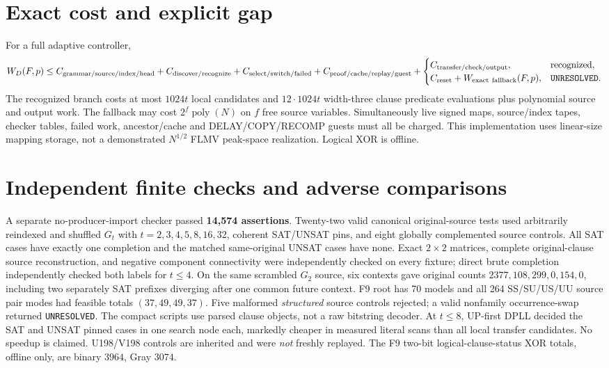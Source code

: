 \documentclass[11pt]{article}
\begin{document}
\section{Exact cost and explicit gap}
For a full adaptive controller,
\[
W_D(F,p)\le C_{\rm grammar/source/index/head}+C_{\rm discover/recognize}
+C_{\rm select/switch/failed}+C_{\rm proof/cache/replay/guest}
+\begin{cases}
C_{\rm transfer/check/output},&\text{recognized},\\
C_{\rm reset}+W_{\rm exact\ fallback}(F,p),&\texttt{UNRESOLVED}.
\end{cases}
\]
The recognized branch costs at most $1024t$ local candidates and $12\cdot1024t$ width-three clause predicate evaluations plus polynomial source and output work. The fallback may cost $2^f\operatorname{poly}(N)$ on $f$ free source variables. Simultaneously live signed maps, source/index tapes, checker tables, failed work, ancestor/cache and DELAY/COPY/RECOMP guests must all be charged. This implementation uses linear-size mapping storage, not a demonstrated $N^{1/2}$ FLMV peak-space realization. Logical XOR is offline.
\section{Independent finite checks and adverse comparisons}
A separate no-producer-import checker passed \textbf{14,574 assertions}. Twenty-two valid canonical original-source tests used arbitrarily reindexed and shuffled $G_t$ with $t=2,3,4,5,8,16,32$, coherent SAT/UNSAT pins, and eight globally complemented source controls. All SAT cases have exactly one completion and the matched same-original UNSAT cases have none. Exact $2\times2$ matrices, complete original-clause source reconstruction, and negative component connectivity were independently checked on every fixture; direct brute completion independently checked both labels for $t\le4$. On the same scrambled $G_2$ source, six contexts gave original counts $2377,108,299,0,154,0$, including two separately SAT prefixes diverging after one common future context. F9 root has 70 models and all 264 SS/SU/US/UU source pair modes had feasible totals $(37,49,49,37)$. Five malformed \emph{structured} source controls rejected; a valid nonfamily occurrence-swap returned \texttt{UNRESOLVED}. The compact scripts use parsed clause objects, not a raw bitstring decoder. At $t\le8$, UP-first DPLL decided the SAT and UNSAT pinned cases in one search node each, markedly cheaper in measured literal scans than all local transfer candidates. No speedup is claimed. U198/V198 controls are inherited and were \emph{not} freshly replayed. The F9 two-bit logical-clause-status XOR totals, offline only, are binary $3964$, Gray $3074$.
\end{document}
